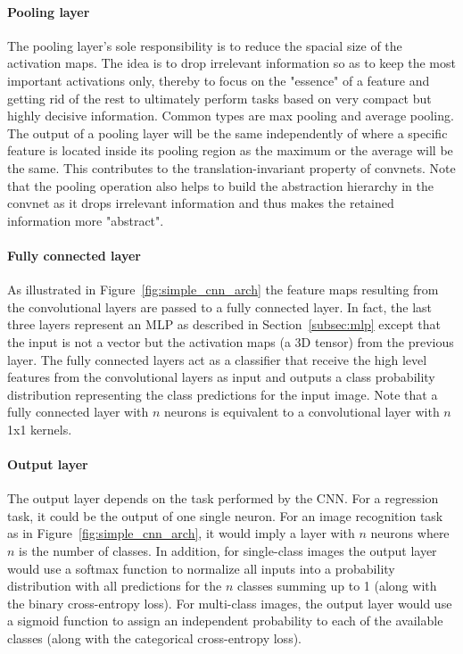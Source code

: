 \documentclass[12pt,a4paper]{article}
\begin{document}
\paragraph{Pooling layer            } The pooling layer's sole responsibility is to reduce the spacial size of the activation maps. The idea is to drop irrelevant information so as to keep the most important activations only, thereby to focus on the "essence" of a feature and getting rid of the rest to ultimately perform tasks based on very compact but highly decisive information. Common types are max pooling and average pooling. The output of a pooling layer will be the same independently of where a specific feature is located inside its pooling region as the maximum or the average will be the same. This contributes to the translation-invariant property of convnets. Note that the pooling operation also helps to build the abstraction hierarchy in the convnet as it drops irrelevant information and thus makes the retained information more "abstract". 

\paragraph{Fully connected layer    } As illustrated in Figure~\ref{fig:simple_cnn_arch} the feature maps resulting from the convolutional layers are passed to a fully connected layer. In fact, the last three layers represent an MLP as described in Section~\ref{subsec:mlp} except that the input is not a vector but the activation maps (a 3D tensor) from the previous layer. The fully connected layers act as a classifier that receive the high level features from the convolutional layers as input and outputs a class probability distribution representing the class predictions for the input image. Note that a fully connected layer with $n$ neurons is equivalent to a convolutional layer with $n$ 1x1 kernels.

\paragraph{Output layer} 
The output layer depends on the task performed by the CNN. For a regression task, it could be the output of one single neuron. For an image recognition task as in Figure~\ref{fig:simple_cnn_arch}, it would imply a layer with $n$ neurons where $n$ is the number of classes. In addition, for single-class images the output layer would use a softmax function to normalize all inputs into a probability distribution with all predictions for the $n$ classes summing up to 1 (along with the binary cross-entropy loss).  For multi-class images, the output layer would use a sigmoid function to assign an independent probability to each of the available classes (along with the categorical cross-entropy loss).
\end{document}
